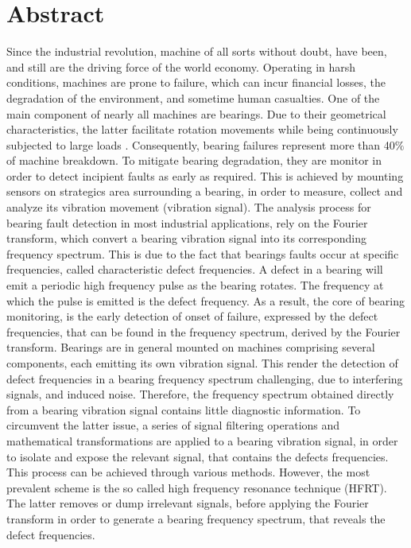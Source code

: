 \documentclass[../Main/thesis.tex]{subfiles}
\begin{document}
\null\vfill
{}
\chapter*{Abstract}
Since the industrial revolution, machine of all sorts without doubt, have been, and still are the driving force of the world economy.
Operating in harsh conditions, machines are prone to failure, which can incur financial losses, the degradation of the environment, and sometime human casualties. 
\justify
 One of the main component of nearly all machines are bearings. Due to their  geometrical characteristics, the latter facilitate rotation movements while being continuously subjected to large loads . Consequently, bearing failures represent more than 40$\%$ of machine breakdown. To mitigate bearing degradation, they are monitor in order to detect incipient faults as early as required. This is achieved by mounting sensors on strategics area   surrounding a bearing, in order to measure, collect and analyze its vibration movement (vibration signal). 
 \justify
The analysis process for bearing fault detection in most industrial applications, rely on the Fourier transform, which convert a bearing vibration signal into its corresponding frequency spectrum. This is due to the fact that bearings faults occur at specific frequencies, called characteristic defect frequencies. A defect in a bearing will emit a periodic high frequency pulse as the bearing rotates. The frequency at which the pulse is emitted is the defect frequency.
 As a result, the core of bearing monitoring, is the early detection of onset of failure, expressed by the defect frequencies, that can be found in the frequency spectrum, derived by the Fourier transform.
 \justify
 Bearings are in general mounted on machines comprising several components, each emitting its own vibration signal.
 This render the detection of defect frequencies in a bearing frequency spectrum challenging, due to interfering  signals, and induced noise. Therefore, the frequency spectrum obtained directly from a bearing vibration signal contains little diagnostic information. To circumvent the latter issue, a series of signal filtering operations and mathematical transformations are applied to a bearing vibration signal, in order to isolate and expose the relevant signal, that contains the defects frequencies. This process can be achieved through various methods. However, the most prevalent scheme is the so called high frequency resonance technique (HFRT). The latter removes or dump irrelevant signals, before applying the Fourier transform in order to generate a bearing frequency spectrum, that reveals the defect frequencies.
\end{document}
